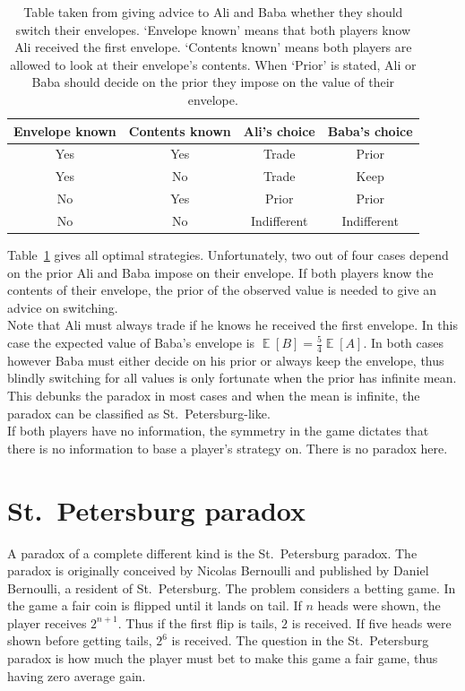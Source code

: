 \documentclass[twoside,a4paper]{article}
\theoremstyle{plain}
\theoremstyle{definition}
\theoremstyle{remark}
\numberwithin{equation}{section}
\DeclareMathOperator{\E}{\mathbb{E}}
\DeclareMathOperator{\1}{\mathbbm{1}}
\begin{document}
\begin{table}
\begin{center}
\begin{tabular}{cc|cc}
Envelope known&Contents known&Ali's choice&Baba's choice\\\hline
Yes&Yes&Trade&Prior\\
Yes&No&Trade&Keep\\
No&Yes&Prior&Prior\\
No&No&Indifferent&Indifferent
\end{tabular}
\end{center}
\caption{Table taken from \cite{Nickerson06} giving advice to Ali and Baba whether they should switch their envelopes. `Envelope known' means that both players know Ali received the first envelope. `Contents known' means both players are allowed to look at their envelope's contents. When `Prior' is stated, Ali or Baba should decide on the prior they impose on the value of their envelope.}
\label{tbl:alibaba}
\end{table}

Table~\ref{tbl:alibaba} gives all optimal strategies. Unfortunately, two out of four cases depend on the prior Ali and Baba impose on their envelope. If both players know the contents of their envelope, the prior of the observed value is needed to give an advice on switching.\\
Note that Ali must always trade if he knows he received the first envelope. In this case the expected value of Baba's envelope is $\E[B]=\frac{5}{4}\E[A]$. In both cases however Baba must either decide on his prior or always keep the envelope, thus blindly switching for all values is only fortunate when the prior has infinite mean. This debunks the paradox in most cases and when the mean is infinite, the paradox can be classified as St.~Petersburg-like.\\
If both players have no information, the symmetry in the game dictates that there is no information to base a player's strategy on. There is no paradox here.

\section{St.~Petersburg paradox}
A paradox of a complete different kind is the St.~Petersburg paradox. The paradox is originally conceived by Nicolas Bernoulli and published by Daniel Bernoulli, a resident of St.~Petersburg. The problem considers a betting game. In the game a fair coin is flipped until it lands on tail. If $n$ heads were shown, the player receives $2^{n+1}$. Thus if the first flip is tails, $2$ is received. If five heads were shown before getting tails, $2^6$ is received. The question in the St.~Petersburg paradox is how much the player must bet to make this game a fair game, thus having zero average gain.
\end{document}
